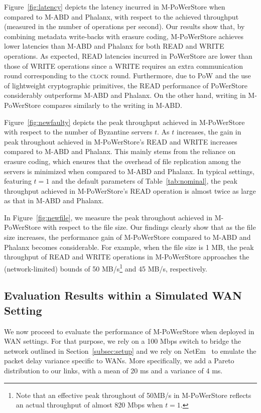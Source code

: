 \documentclass[10pt,conference,compsocconf]{IEEEtran}
\newcommand{\protocol}{PoWerStore}
\newcommand{\mprotocol}{M-PoWerStore}
\begin{document}
Figure~\ref{fig:latency} depicts the latency incurred in \mprotocol{} when compared to M-ABD and Phalanx, with respect to the achieved throughput (measured in the number of operations per second).
Our results show that, by combining metadata write-backs with erasure coding, \mprotocol{} achieves lower latencies than M-ABD and Phalanx for both \textsc{READ} and \textsc{WRITE} operations.
As expected, \textsc{READ} latencies incurred in \protocol{} are lower than those of \textsc{WRITE} operations since a \textsc{WRITE} requires an extra communication round corresponding to the \textsc{clock} round. Furthermore, due to PoW and the use of lightweight cryptographic primitives, the \textsc{READ} performance of \protocol{} considerably outperforms M-ABD and Phalanx. On the other hand, writing in \mprotocol{} compares similarly to the writing in M-ABD.

Figure~\ref{fig:newfaulty} depicts the peak throughput achieved in \mprotocol{} with respect to the number of Byzantine servers $t$.
As $t$ increases, the gain in peak throughout achieved in \mprotocol's \textsc{READ} and \textsc{WRITE} increases compared to M-ABD and Phalanx. This mainly stems from the reliance on erasure coding, which ensures that
the overhead of file replication among the servers is minimized when compared to M-ABD and Phalanx. In typical settings, featuring $t=1$ and the default parameters of Table~\ref{tab:nominal}, the peak throughput achieved in \mprotocol's \textsc{READ} operation is almost twice as large as that in M-ABD and Phalanx.

In Figure~\ref{fig:newfile}, we measure the peak throughout achieved in \mprotocol{} with respect to the file size. Our findings clearly show that as the file size increases, the performance gain of \mprotocol{} compared to M-ABD and Phalanx becomes considerable. For example, when the file size is 1 MB, the peak throughput of \textsc{READ} and \textsc{WRITE} operations in \mprotocol{} approaches the (network-limited) bounds of 50 MB/s\footnote{Note that an effective peak throughout of 50MB/s in \mprotocol{} reflects an actual throughput of almost 820 Mbps when $t=1$.} and 45 MB/s, respectively.



\subsection{Evaluation Results within a Simulated WAN Setting}\label{subsec:wan}

We now proceed to evaluate the  performance of \mprotocol{} when deployed in WAN settings. For that purpose, we rely on a 100 Mbps switch to bridge the network outlined in Section~\ref{subsec:setup} and
we rely on NetEm~\cite{netem} to emulate the packet delay variance specific to WANs. More specifically, we add a Pareto distribution to our links, with a mean of 20 ms and a variance of 4 ms.
\end{document}
